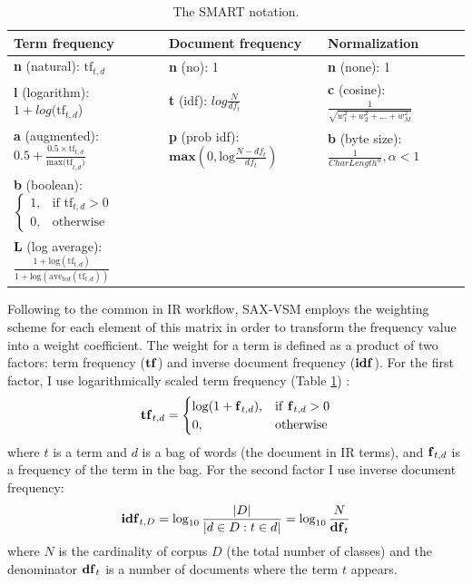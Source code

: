\begin{table}
\caption{The SMART notation. }
\vspace{0.4cm}
\label{tbl:smart}
{\footnotesize
\begin{tabularx}{\textwidth}{l l l}
\toprule[1pt]
\textbf{Term frequency} &\textbf{Document frequency} &\textbf{Normalization} \\[0.5ex]
\midrule
\textbf{n} (natural):  $\text{tf}_{t,d}$ & \textbf{n} (no): 1 & \textbf{n} (none): 1 \\[2ex]
\textbf{l} (logarithm): $1+log(\text{tf}_{t,d}$) & \textbf{t} (idf): $log\tfrac{N}{df_{t}}$ & \textbf{c} (cosine): $\tfrac{1}{\sqrt{w_1^2 + w_2^2 + ... + w_M^2}}$ \\[2ex]
\textbf{a} (augmented): $0.5 + \tfrac{0.5 \times \text{tf}_{t,d}}{\text{max(tf}_{t,d})}$ & \textbf{p} (prob idf): $\textbf{max}\left( 0,\text{log}\tfrac{N-df_{t}}{df_{t}} \right) $ & 
\textbf{b} (byte size): $\tfrac{1}{CharLength^\alpha}, \alpha < 1 $ \\[2ex]
\textbf{b} (boolean): $\begin{cases} 1, & \text{if tf}_{t,d} > 0 \\ 0, & \text{otherwise} \end{cases} $ & & \\[3ex]
\textbf{L} (log average): $ \tfrac{1+\text{log}(\text{tf}_{t,d})}{1+\text{log}(\text{ave}_{t \epsilon d}( \text{tf}_{t,d}))}$ & & \\[1ex]
\bottomrule[1pt]
\end{tabularx}
}
\end{table}

Following to the common in IR workflow, SAX-VSM employs the \tfidf weighting scheme \cite{citeulike:4469058} for each element 
of this matrix in order to transform the frequency value into a weight coefficient. 
The \tfidf weight for a term is defined as a product of two factors: term frequency ($\text{\textbf{tf}}$) 
and inverse document frequency ($\text{\textbf{idf}}$). 
For the first factor, I use logarithmically scaled term frequency (Table \ref{tbl:smart}) \cite{citeulike:4469058}:
\begin{equation}
 \mbox{\textbf{tf}}_{t, d} =  \begin{cases} \log(1 + \mbox{\textbf{f}}_{t,d}), &\mbox{if \textbf{f}}_{t,d}>0  \\
0, & \mbox{otherwise} \end{cases}
\end{equation} 
where $t$ is a term and $d$ is a bag of words (the document in IR terms), and $\mbox{\textbf{f}}_{t,d}$ 
is a frequency of the term in the bag.
For the second factor I use inverse document frequency:
\begin{equation}
 \mbox{\textbf{idf}}_{t, D} =  \log_{10}\frac{|D|}{|d \in D : t \in d|} = \log_{10}\frac{N}{\mbox{\textbf{df}}_{t}}
 \label{formula:idf}
\end{equation} 
where $N$ is the cardinality of corpus $D$ (the total number of classes) and the 
denominator $\mbox{\textbf{df}}_{t}$ is a number of documents where the term $t$ appears.

